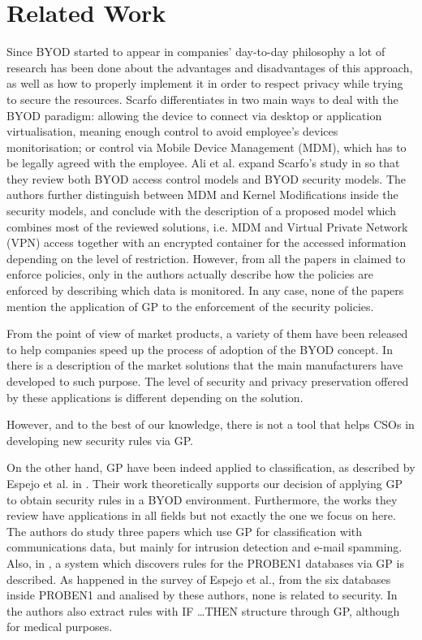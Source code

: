 \documentclass[a4paper,10pt,twocolumn,preprint,3p]{elsarticle}
\begin{document}
\section{Related Work}
\label{sec:SotA}


Since BYOD started to appear in companies' day-to-day philosophy a lot of research has been done about the advantages and disadvantages of this approach, as well as how to properly implement it in order to respect privacy while trying to secure the resources. Scarfo differentiates in \cite{scarfo2012new} two main ways to deal with the BYOD paradigm: allowing the device to connect via desktop or application virtualisation, meaning enough control to avoid employee's devices monitorisation; or control via Mobile Device Management (MDM), which has to be legally agreed with the employee. Ali et al. expand Scarfo's study in \cite{ali2015analysis} so that they review both BYOD access control models and BYOD security models. The authors further distinguish between MDM and Kernel Modifications inside the security models, and conclude with the description of a proposed model which combines most of the reviewed solutions, i.e. MDM and Virtual Private Network (VPN) access together with an encrypted container for the accessed information depending on the level of restriction. However, from all the papers in \cite{ali2015analysis} claimed to enforce policies, only in \cite{rhee2013high} the authors actually describe how the policies are enforced by describing which data is monitored. In any case, none of the papers mention the application of GP to the enforcement of the security policies.

From the point of view of market products, a variety of them have been released to help companies speed up the process of adoption of the BYOD concept. In \cite{de2015corporate} there is a description of the market solutions that the main manufacturers have developed to such purpose. The level of security and privacy preservation offered by these applications is different depending on the solution.

However, and to the best of our knowledge, there is not a tool that helps CSOs in developing new security rules via GP.

On the other hand, GP have been indeed applied to classification, as described by Espejo et al. in \cite{espejo2010survey}. Their work theoretically supports our decision of applying GP to obtain security rules in a BYOD environment. Furthermore, the works they review have applications in all fields but not exactly the one we focus on here. The authors do study three papers which use GP for classification with communications data, but mainly for intrusion detection and e-mail spamming. Also, in \cite{DeFalco2002257}, a system which discovers rules for the PROBEN1 databases via GP is described. As happened in the survey of Espejo et al., from the six databases inside PROBEN1 and analised by these authors, none is related to security.
In \cite{Tsakonas2004195} the authors also extract rules with \textsc{IF \ldots THEN} structure through GP, although for medical purposes.
\end{document}
